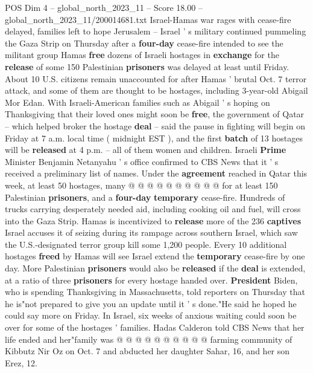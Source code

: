 \begin{textsample}{POS Dim 4 – global\_north\_2023\_11 – Score 18.00 – global\_north\_2023\_11/200014681.txt}  \label{ex:f4_pos_206}
Israel-Hamas war rages with cease-fire delayed, families left to hope Jerusalem -- Israel ' s military continued pummeling the Gaza Strip on Thursday after a \textbf{four-day} cease-fire intended to see the militant group Hamas \textbf{free} dozens of Israeli hostages in \textbf{exchange} for the \textbf{release} of some 150 Palestinian \textbf{prisoners} was delayed at least until Friday.
About 10 U.S. citizens remain unaccounted for after Hamas ' brutal Oct. 7 terror attack, and some of them are thought to be hostages, including 3-year-old Abigail Mor Edan.
With Israeli-American families such as Abigail ' s hoping on Thanksgiving that their loved ones might soon be \textbf{free}, the government of Qatar -- which helped broker the hostage \textbf{deal} -- said the pause in fighting will begin on Friday at 7 a.m. local time ( midnight EST ), and the first \textbf{batch} of 13 hostages will be \textbf{released} at 4 p.m. -- all of them women and children.
Israeli \textbf{Prime} Minister Benjamin Netanyahu ' s office confirmed to CBS News that it ' s received a preliminary list of names.
Under the \textbf{agreement} reached in Qatar this week, at least 50 hostages, many @ @ @ @ @ @ @ @ @ @ for at least 150 Palestinian \textbf{prisoners}, and a \textbf{four-day} \textbf{temporary} cease-fire.
Hundreds of trucks carrying desperately needed aid, including cooking oil and fuel, will cross into the Gaza Strip.
Hamas is incentivized to \textbf{release} more of the 236 \textbf{captives} Israel accuses it of seizing during its rampage across southern Israel, which saw the U.S.-designated terror group kill some 1,200 people.
Every 10 additional hostages \textbf{freed} by Hamas will see Israel extend the \textbf{temporary} cease-fire by one day.
More Palestinian \textbf{prisoners} would also be \textbf{released} if the \textbf{deal} is extended, at a ratio of three \textbf{prisoners} for every hostage handed over. \textbf{President} Biden, who is spending Thanksgiving in Massachusetts, told reporters on Thursday that he is"not prepared to give you an update until it ' s done."He said he hoped he could say more on Friday.
In Israel, six weeks of anxious waiting could soon be over for some of the hostages ' families.
Hadas Calderon told CBS News that her life ended and her"family was @ @ @ @ @ @ @ @ @ @ farming community of Kibbutz Nir Oz on Oct. 7 and abducted her daughter Sahar, 16, and her son Erez, 12.

\end{textsample}
